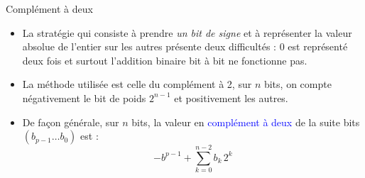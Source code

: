 \documentclass[10pt]{beamer}
\begin{document}
\begin{frame}{\Ctitle}{\stitle}
    \begin{block}{Complément à deux}
        \begin{itemize}
            \item<1-> La stratégie qui consiste à prendre \textit{un bit de signe}  et à représenter la valeur absolue de l'entier sur les autres présente deux difficultés : 0 est représenté deux fois et surtout l'addition binaire bit à bit ne fonctionne pas.
            \item<2-> La méthode utilisée est celle du complément à 2, sur $n$ bits, on compte négativement le bit de poids $2^{n-1}$ et positivement les autres. \\
            \item<3-> De façon générale, sur $n$ bits, la valeur en \textcolor{blue}{complément à deux} de la suite bits $(b_{p-1}\dots b_0)$ est : 
            $$-b^{p-1} + \sum_{k=0}^{n-2} b_k\,2^k $$
        \end{itemize}
    \end{block}
\end{frame}
\end{document}
